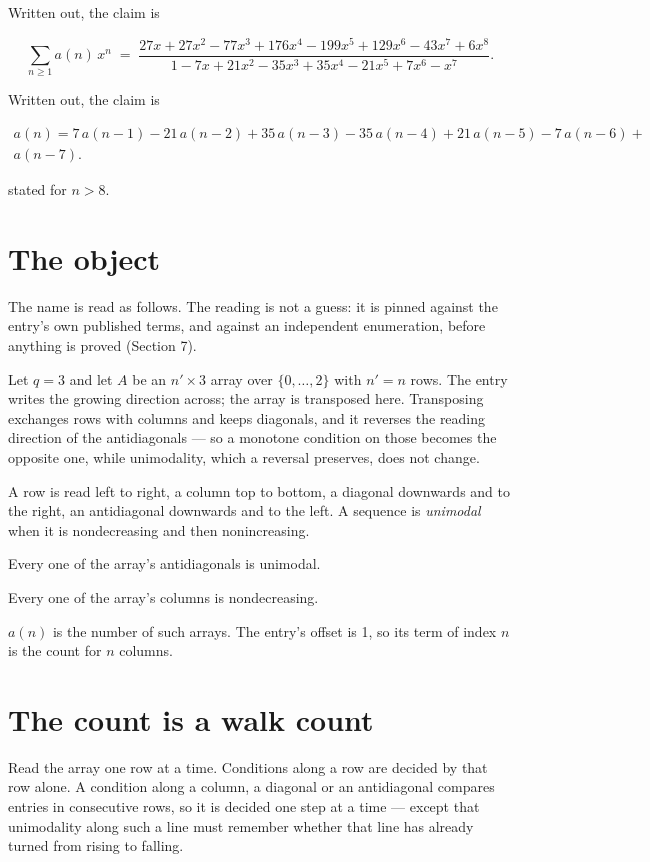 \documentclass[11pt]{article}
\theoremstyle{definition}
\begin{document}
Written out, the claim is

\[\sum_{n \ge 1} a(n)\,x^n \;=\; \frac{27x + 27x^{2} - 77x^{3} + 176x^{4} - 199x^{5} + 129x^{6} - 43x^{7} + 6x^{8}}{1 - 7x + 21x^{2} - 35x^{3} + 35x^{4} - 21x^{5} + 7x^{6} - x^{7}}.\]

Written out, the claim is

\begin{multline*} a(n) = 7\,a(n-1) - 21\,a(n-2) + 35\,a(n-3) - 35\,a(n-4) + 21\,a(n-5) - 7\,a(n-6) + \\ a(n-7). \end{multline*}

stated for $n > 8$.

\section{The object}

The name is read as follows. The reading is not a guess: it is pinned against the entry's own published terms, and against an independent enumeration, before anything is proved (Section 7).

Let $q = 3$ and let $A$ be an $n' \times 3$ array over $\{0,\dots,2\}$ with $n' = n$ rows. The entry writes the growing direction across; the array is transposed here. Transposing exchanges rows with columns and keeps diagonals, and it reverses the reading direction of the antidiagonals --- so a monotone condition on those becomes the opposite one, while unimodality, which a reversal preserves, does not change.

A row is read left to right, a column top to bottom, a diagonal downwards and to the right, an antidiagonal downwards and to the left. A sequence is {\itshape unimodal} when it is nondecreasing and then nonincreasing.

Every one of the array's antidiagonals is unimodal.

Every one of the array's columns is nondecreasing.

$a(n)$ is the number of such arrays. The entry's offset is 1, so its term of index $n$ is the count for $n$ columns.

\section{The count is a walk count}

Read the array one row at a time. Conditions along a row are decided by that row alone. A condition along a column, a diagonal or an antidiagonal compares entries in consecutive rows, so it is decided one step at a time --- except that unimodality along such a line must remember whether that line has already turned from rising to falling.
\end{document}
